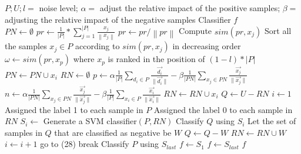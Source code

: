 \documentclass{article}
\begin{document}
\begin{algorithm}[!h]
\renewcommand{\algorithmicrequire}{\textbf{Input:}} %
\renewcommand{\algorithmicensure}{\textbf{Output:}} %
	\caption{CR-SVM} %
	\begin{algorithmic}[1] %
	    \REQUIRE
	    $P;U;l=$ noise level; $\alpha=$ adjust the relative impact of the positive samples; $\beta=$ adjusting the relative impact of the negative samples
	    \ENSURE
	    Classifier $f$ \\
	    \STATE $PN\leftarrow \emptyset$
	    \STATE $pr\leftarrow \frac{1}{|P|}*\sum_{j=1}^{|P|}\frac{x_j}{\left\|{x}_{j}\right\|}$
	    \ENDFOR
	    \STATE $pr\leftarrow pr/\left\|pr\right\|$
	    \STATE Compute $sim(pr,x_j)$
	    \ENDFOR
	    \STATE Sort all the samples $x_j\in P$ according to $sim(pr, x_j)$ in decreasing order
	    \STATE $\omega\leftarrow sim(pr,x_p)$ where $x_p$ is ranked in the position of $(1-l)*|P|$
	    \STATE $PN\leftarrow PN\cup x_i$
	    \ENDIF
	    \ENDFOR
	    \STATE $RN\leftarrow \emptyset$
	    \STATE $p\leftarrow \alpha \frac{1}{|P|} \sum_{d_i \in P} \frac{\vec{d_i}}{\|\vec{d_i}\|}-\beta \frac{1}{|PN|} \sum_{x_j \in PN} \frac{\vec{x_j}}{\|\vec{x_j}\|}$
	    \STATE $n\leftarrow \alpha \frac{1}{|PN|} \sum_{x_j \in PN} \frac{\vec{x_j}}{\|\vec{x_j}\|}-\beta \frac{1}{|P|} \sum_{x_i \in P} \frac{\vec{x_i}}{\|\vec{x_i}\|}$
	    \STATE $RN\leftarrow RN\cup x_i$
	    \ENDIF
	    \ENDFOR
	    \STATE $Q\leftarrow U-RN$
	    \STATE $i\leftarrow 1$
	    \STATE Assigned the label 1 to each sample in $P$
	    \STATE Assigned the label 0 to each sample in $RN$
	    \STATE $S_i\leftarrow$ Generate a SVM classifier$(P,RN)$
	    \STATE Classify $Q$ using $S_i$
	    \STATE Let the set of samples in $Q$ that are classified as negative be $W$
	    \STATE $Q\leftarrow Q-W$
	    \STATE $RN\leftarrow RN\cup W$
	    \STATE $i\leftarrow i+1$
	    \STATE go to (28)
	    \ELSE
	    \STATE break
	    \ENDIF
	    \STATE Classify $P$ using $S_{last}$
	    \STATE $f\leftarrow S_1$
	    \ELSE
	    \STATE $f\leftarrow S_{last}$
	    \ENDIF
	    \RETURN $f$
	\end{algorithmic}
\end{algorithm}
\end{document}
